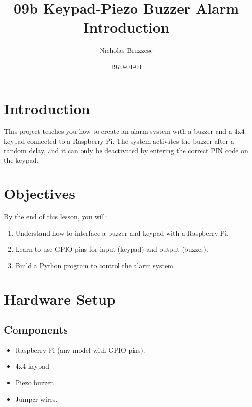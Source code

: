 \documentclass{article}
\title{09b Keypad-Piezo Buzzer Alarm Introduction}
\author{Nicholas Bruzzese}
\date{\today}
\begin{document}
	
	\maketitle
	
	\section*{Introduction}
	This project teaches you how to create an alarm system with a buzzer and a 4x4 keypad connected to a Raspberry Pi. The system activates the buzzer after a random delay, and it can only be deactivated by entering the correct PIN code on the keypad.
	
	\section*{Objectives}
	By the end of this lesson, you will:
	\begin{enumerate}
		\item Understand how to interface a buzzer and keypad with a Raspberry Pi.
		\item Learn to use GPIO pins for input (keypad) and output (buzzer).
		\item Build a Python program to control the alarm system.
	\end{enumerate}
	
	\section*{Hardware Setup}
	\subsection*{Components}
	\begin{itemize}
		\item Raspberry Pi (any model with GPIO pins).
		\item 4x4 keypad.
		\item Piezo buzzer.
		\item Jumper wires.
	\end{itemize}
	
\end{document}
